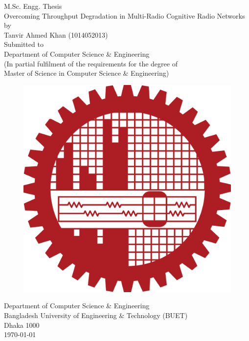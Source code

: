 \begin{titlepage}
\centering 
 {\sc \Large M.Sc. Engg. Thesis} \\
 \vspace{1 cm}
 {\huge \sc Overcoming Throughput Degradation in Multi-Radio Cognitive Radio Networks}\\
 \vspace{0.5 cm}
 {\Large by \\
\sc Tanvir Ahmed Khan} (1014052013) \\
 \vspace{2cm}
 {\Large Submitted to}\\
 {\Large Department of Computer Science \& Engineering\\
 (In partial fulfilment of the requirements for the degree of \\
 Master of Science in Computer Science \& Engineering)} \\
 \vspace{1cm}
 \begin{figure}[h] 
 \centering
 \includegraphics[scale=0.08]{figures/buet_logo}
 \end{figure}
 \vspace{0.3cm}
 {\Large Department of Computer Science \& Engineering\\
 	Bangladesh University of Engineering \& Technology (BUET)\\
 	Dhaka 1000 \\
 }
 \vspace{1cm}
 {\today}
\end{titlepage}
